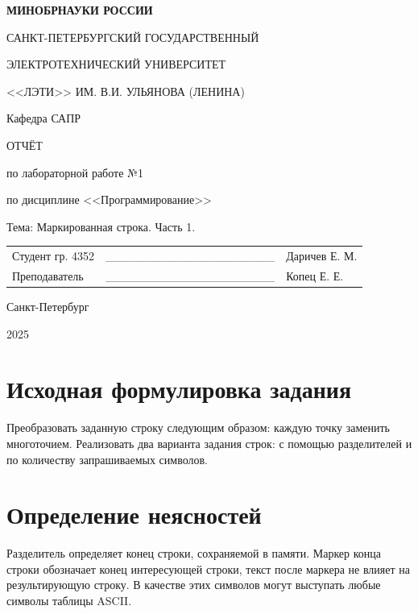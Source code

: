 \documentclass[12pt,a4paper]{extarticle}
\begin{document}
\begin{titlepage}
    \begin{center}
        {\bfseries\large
        МИНОБРНАУКИ РОССИИ\par
        САНКТ-ПЕТЕРБУРГСКИЙ ГОСУДАРСТВЕННЫЙ\par
        ЭЛЕКТРОТЕХНИЧЕСКИЙ УНИВЕРСИТЕТ\par
        <<ЛЭТИ>> ИМ. В.И. УЛЬЯНОВА (ЛЕНИНА)\par
        Кафедра САПР
        
        \vspace{0.23\textheight}
        
        ОТЧЁТ\par
        по лабораторной работе №1\par
        по дисциплине <<Программирование>>\par
        Тема: Маркированная строка. Часть 1.
        
        \vspace{0.28\textheight}
        }
        \begin{table}[h!]
            \centering\large
            \begin{tabularx}{\textwidth}{p{60mm}X>{\centering\arraybackslash}p{45mm}}
                Студент гр. 4352 & \_\_\_\_\_\_\_\_\_\_\_\_\_\_\_\_\_\_\_\_ & {Даричев Е. М.} \\ [5.4mm]  %
                Преподаватель    & \_\_\_\_\_\_\_\_\_\_\_\_\_\_\_\_\_\_\_\_ & {Копец Е. Е.} \\ [5.4mm]
            \end{tabularx}
        \end{table}

        \vspace{0.1\textheight}
        \large
        Санкт-Петербург\par
        2025
    \end{center}
\end{titlepage}
\setcounter{page}{2}
\tableofcontents
\newpage

\section{Исходная формулировка задания}
Преобразовать заданную строку следующим образом:
каждую точку заменить многоточием. Реализовать два варианта
задания строк: с помощью разделителей и по количеству запрашиваемых
символов.

\section{Определение неясностей}
Разделитель определяет конец строки, сохраняемой в памяти.
Маркер конца строки обозначает конец интересующей строки,
текст после маркера не влияет на результирующую строку. В
качестве этих символов могут выступать любые символы 
таблицы ASCII.
\end{document}

